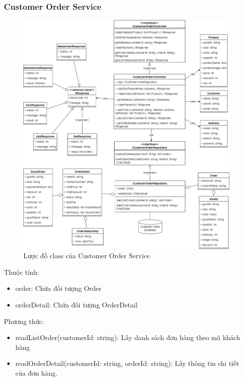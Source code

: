 \subsubsection{Customer Order Service}
\begin{figure}[!htp]
	\centering
	\includegraphics[width=13cm]{img/Architecture/service/CustomerOrderService.png}
	\newline
	\caption{Lược đồ class của Customer Order Service}
\end{figure}

	Thuộc tính:
	\begin{itemize}
		\item order: Chứa đối tượng Order
		\item orderDetail: Chứa đối tượng OrderDetail
	\end{itemize}
	Phương thức:
	\begin{itemize}
		\item readListOrder(customerId: string): Lấy danh sách đơn hàng theo mã khách hàng
		\item readOrderDetail(customerId: string, orderId: string): Lấy thông tin chi tiết của đơn hàng.
	\end{itemize}

